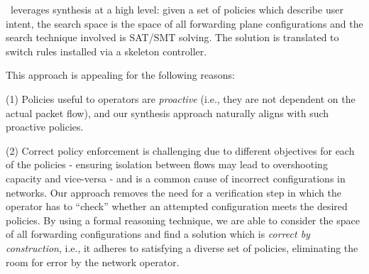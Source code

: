 \Name\ leverages synthesis at a high level: given a set of
policies which describe user intent, the search space is the space of
all forwarding plane configurations and the search technique involved
is SAT/SMT solving. The solution is translated to switch rules installed via a skeleton controller.

This approach is appealing for the following reasons: 

(1)
Policies useful to operators are \emph{proactive} (i.e., they are not
dependent on the actual packet flow), and our synthesis approach
naturally aligns with such proactive policies.


(2) Correct policy enforcement is challenging due to different
objectives for each of the policies - ensuring isolation between flows
may lead to overshooting capacity and vice-versa - and is a common
cause of incorrect configurations in networks.  Our approach removes
the need for a verification step in which the operator has to
``check'' whether an attempted configuration meets the desired
policies.  By using a formal reasoning technique, we are able to
consider the space of all forwarding configurations and find a
solution which is \emph{correct by construction}, i.e., it adheres to
satisfying a diverse set of policies, eliminating the room for error
by the network operator.

